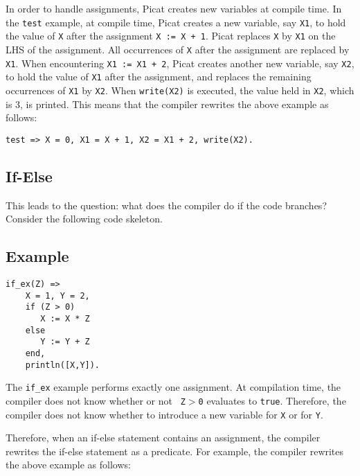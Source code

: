 In order to handle assignments, Picat creates new variables at compile time.  In the \texttt{test} example, at compile time, Picat creates a new variable, say \texttt{X1}, to hold the value of \texttt{X} after the assignment \verb-X := X + 1-. Picat replaces \texttt{X} by \texttt{X1} on the LHS of the assignment.  All occurrences of \texttt{X} after the assignment are replaced by \texttt{X1}.  When encountering \verb-X1 := X1 + 2-, Picat creates another new variable, say \texttt{X2}, to hold the value of \texttt{X1} after the assignment, and replaces the remaining occurrences of \texttt{X1} by \texttt{X2}. When \texttt{write(X2)} is executed, the value held in \texttt{X2}, which is 3, is printed.  This means that the compiler rewrites the above example as follows:
\begin{verbatim}
test => X = 0, X1 = X + 1, X2 = X1 + 2, write(X2).
\end{verbatim}

\subsection{If-Else}
This leads to the question: what does the compiler do if the code branches?  Consider the following code skeleton.
\subsection*{Example}
\begin{verbatim}
if_ex(Z) =>
    X = 1, Y = 2,
    if (Z > 0)
       X := X * Z    
    else
       Y := Y + Z
    end,
    println([X,Y]).
\end{verbatim}

The \texttt{if\_ex} example performs exactly one assignment.  At compilation time, the compiler does not know whether or not \texttt{ Z$>$0} evaluates to \texttt{true}.  Therefore, the compiler does not know whether to introduce a new variable for \texttt{X} or for \texttt{Y}.

Therefore, when an if-else statement contains an assignment, the compiler rewrites the if-else statement as a predicate.  For example, the compiler rewrites the above example as follows:

